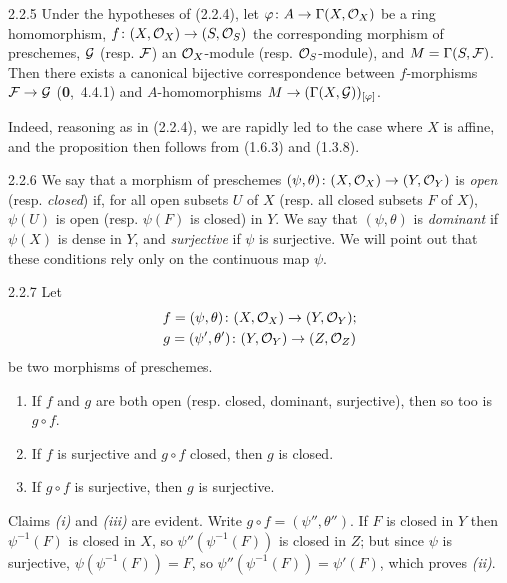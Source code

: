 \documentclass[../main.tex]{subfiles}
\begin{document}
\begin{env}[Proposition]{2.2.5}
    Under the hypotheses of (2.2.4), let $\varphi\colon A\to\Gamma(X,\mathcal{O}_X)$ be a ring homomorphism, $f\colon(X,\mathcal{O}_X)\to(S,\mathcal{O}_S)$ the corresponding morphism of preschemes, $\mathcal{G}$ (resp. $\mathcal{F}$) an $\mathcal{O}_X$-module (resp. $\mathcal{O}_S$-module), and $M=\Gamma(S,\mathcal{F})$.
    Then there exists a canonical bijective correspondence between $f$-morphisms $\mathcal{F}\to\mathcal{G}$ (\textbf{0},~4.4.1) and $A$-homomorphisms $M\to(\Gamma(X,\mathcal{G}))_{[\varphi]}$.
\end{env}
Indeed, reasoning as in (2.2.4), we are rapidly led to the case where $X$ is affine, and the proposition then follows from (1.6.3) and (1.3.8).

\begin{env}{2.2.6}
    We say that a morphism of preschemes $(\psi,\theta)\colon(X,\mathcal{O}_X)\to(Y,\mathcal{O}_Y)$ is \emph{open} (resp. \emph{closed}) if, for all open subsets $U$ of $X$ (resp. all closed subsets $F$ of $X$), $\psi(U)$ is open (resp. $\psi(F)$ is closed) in $Y$.
    We say that $(\psi,\theta)$ is \emph{dominant} if $\psi(X)$ is dense in $Y$, and \emph{surjective} if $\psi$ is surjective.
    We will point out that these conditions rely only on the continuous map $\psi$.
\end{env}

\begin{env}[Proposition]{2.2.7}
    Let
    \begin{gather*}
        f=(\psi,\theta)\colon(X,\mathcal{O}_X)\to(Y,\mathcal{O}_Y);\\
        g=(\psi',\theta')\colon(Y,\mathcal{O}_Y)\to(Z,\mathcal{O}_Z)
    \end{gather*}
    be two morphisms of preschemes.
    \begin{enumerate}[label=(\roman*)]
        \item If $f$ and $g$ are both open (resp. closed, dominant, surjective), then so too is $g\circ f$.
        \item If $f$ is surjective and $g\circ f$ closed, then $g$ is closed.
        \item If $g\circ f$ is surjective, then $g$ is surjective.
    \end{enumerate}
\end{env}
Claims \emph{(i)} and \emph{(iii)} are evident.
Write $g\circ f=(\psi'',\theta'')$.
If $F$ is closed in $Y$ then $\psi^{-1}(F)$ is closed in $X$, so $\psi''(\psi^{-1}(F))$ is closed in $Z$; but since $\psi$ is surjective, $\psi(\psi^{-1}(F))=F$, so $\psi''(\psi^{-1}(F))=\psi'(F)$, which proves \emph{(ii)}.
\end{document}
